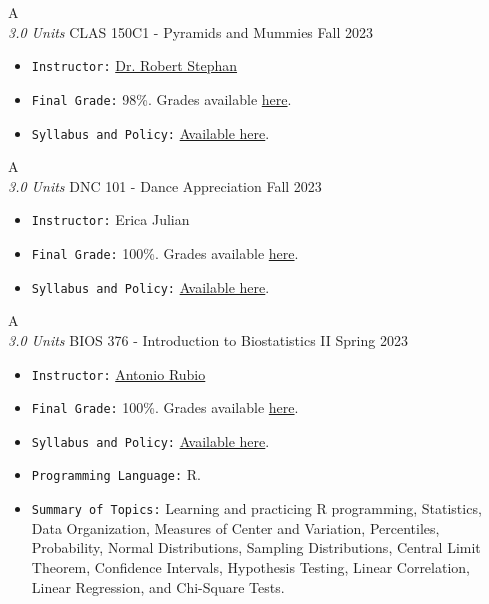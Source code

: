 \cventry
{A \\ \small{\textit{3.0 Units}}}
{CLAS 150C1 - Pyramids and Mummies}
{Fall 2023}
{}
{}
{
  \begin{itemize}
    \item \texttt{Instructor:} \href{https://classics.arizona.edu/people/rstephan}{Dr. Robert Stephan}
    \item \texttt{Final Grade:} 98\%. Grades available \href{https://mhrezaei.com/assets/cv/courses/Fall2023/CLAS150C1/Grades.pdf}{here}.
    \item \texttt{Syllabus and Policy:} \href{https://mhrezaei.com/assets/cv/courses/Fall2023/CLAS150C1/Syllabus.pdf}{Available here}.
  \end{itemize}
}

\cventry
{A \\ \small{\textit{3.0 Units}}}
{DNC 101 - Dance Appreciation}
{Fall 2023}
{}
{}
{
  \begin{itemize}
    \item \texttt{Instructor:} Erica Julian
    \item \texttt{Final Grade:} 100\%. Grades available \href{https://mhrezaei.com/assets/cv/courses/Fall2023/DNC101/Grades.pdf}{here}.
    \item \texttt{Syllabus and Policy:} \href{https://mhrezaei.com/assets/cv/courses/Fall2023/DNC101/Syllabus.pdf}{Available here}.
  \end{itemize}
}

\cventry
{A \\ \small{\textit{3.0 Units}}}
{BIOS 376 - Introduction to Biostatistics II}
{Spring 2023}
{}
{}
{
  \begin{itemize}
    \item \texttt{Instructor:} \href{https://publichealth.arizona.edu/directory/antonio-rubio}{Antonio Rubio}
    \item \texttt{Final Grade:} 100\%. Grades available \href{https://mhrezaei.com/assets/cv/courses/Spring2023/BIOS376/Grades.pdf}{here}.
    \item \texttt{Syllabus and Policy:} \href{https://mhrezaei.com/assets/cv/courses/Spring2023/BIOS376/Syllabus.pdf}{Available here}.
    \item \texttt{Programming Language:} R.
    \item \texttt{Summary of Topics:} Learning and practicing R programming, Statistics, Data Organization, Measures of Center and Variation, Percentiles, Probability, Normal Distributions, Sampling Distributions, Central Limit Theorem, Confidence Intervals, Hypothesis Testing, Linear Correlation, Linear Regression, and Chi-Square Tests.
  \end{itemize}
}

